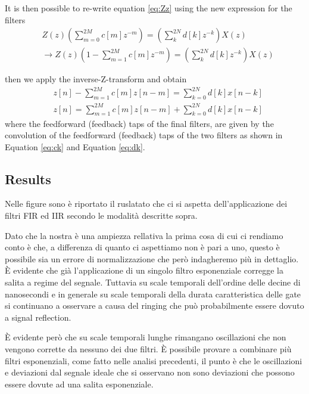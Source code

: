 It is then possible to re-write equation \ref{eq:Zz} using the new expression for the filters
\begin{align}
    & Z(z)\left( \sum_{m=0}^{2M} c[m]z^{-m} \right) = \left( \sum_{k}^{2N} d[k]z^{-k} \right)X(z)\\
    & \rightarrow Z(z)\left(1 - \sum_{m=1}^{2M} c[m]z^{-m} \right) = \left( \sum_{k}^{2N} d[k]z^{-k} \right)X(z) \label{eq:z_final}
\end{align} 

then we apply the inverse-Z-transform and obtain
\begin{align}
    & z[n] - \sum_{m=1}^{2M} c[m]z[n-m] = \sum_{k=0}^{2N} d[k] x[n-k]\\
    & z[n] = \sum_{m=1}^{2M} c[m]z[n-m] + \sum_{k=0}^{2N} d[k] x[n-k]
\end{align}
where the feedforward (feedback) taps of the final filters, are given by the convolution of the feedforward (feedback) taps of the two filters as shown in Equation \ref{eq:ck} and Equation \ref{eq:dk}.

\subsection{Results}

Nelle figure  sono è riportato il ruslatato che ci si aspetta dell'applicazione dei filtri FIR ed IIR secondo le modalità descritte sopra.

Dato che la nostra è una ampiezza rellativa la prima cosa di cui ci rendiamo conto è che, a differenza di quanto ci aspettiamo non è pari a uno, questo è possibile sia un errore di normalizzazione che però indagheremo più in dettaglio.
È evidente che già l'applicazione di un singolo filtro esponenziale corregge la salita a regime del segnale.
Tuttavia su scale temporali dell'ordine delle decine di nanosecondi e in generale su scale temporali della durata caratteristica delle gate si continuano a osservare a causa del ringing che può probabilmente essere dovuto a signal reflection.

È evidente però che su scale temporali lunghe rimangano oscillazioni che non vengono corrette da nessuno dei due filtri.
È possibile provare a combinare più filtri esponenziali, come fatto nelle analisi precedenti, il punto è che le oscillazioni e deviazioni dal segnale ideale che si osservano non sono deviazioni che possono essere dovute ad una salita esponenziale.



